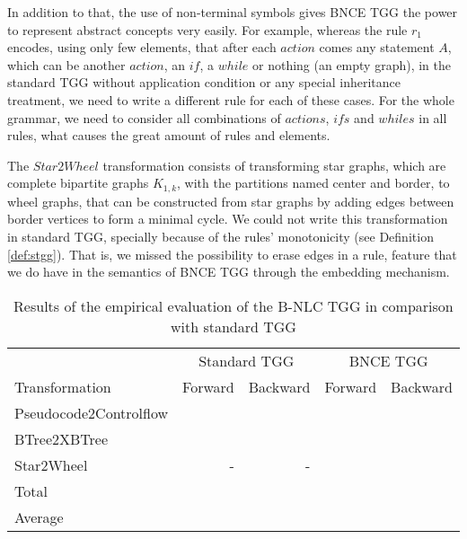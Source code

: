 \documentclass[]{report}
\begin{document}
In addition to that, the use of non-terminal symbols gives BNCE TGG the power to represent abstract concepts very easily. For example, whereas the rule $r_1$ encodes, using only few elements, that after each $action$ comes any statement $A$, which can be another $action$, an $if$, a $while$ or nothing (an empty graph), in the standard TGG without application condition or any special inheritance treatment, we need to write a different rule for each of these cases. For the whole grammar, we need to consider all combinations of $actions$, $ifs$ and $whiles$ in all rules, what causes the great amount of rules and elements.

The $Star2Wheel$ transformation consists of transforming star graphs, which are complete bipartite graphs $K_{1,k}$, with the partitions named center and border, to wheel graphs, that can be constructed from star graphs by adding edges between border vertices to form a minimal cycle. We could not write this transformation in standard TGG, specially because of the rules' monotonicity (see Definition \ref{def:stgg}). That is, we missed the possibility to erase edges in a rule, feature that we do have in the semantics of BNCE TGG through the embedding mechanism.





\begin{table}[h]
	\centering
	\begin{tabular}{l r r r r }
			& \multicolumn{2}{c}{Standard TGG} & \multicolumn{2}{c}{BNCE TGG}\\
		Transformation 	& Forward & Backward & Forward & Backward \\
		\hline
		Pseudocode2Controlflow	& 		& 		& 	 	&  \\
		BTree2XBTree			&  		& 		& 		&  \\
		Star2Wheel				& -		& -		& 	 	&  \\
		\hline
		Total					&  & 		&	& \\
		Average					&  & 		&	& \\
	\end{tabular}
	\caption{Results of the empirical evaluation of the B-NLC TGG in comparison with standard TGG}
	\label{tab:evaluation}
\end{table}
\end{document}
